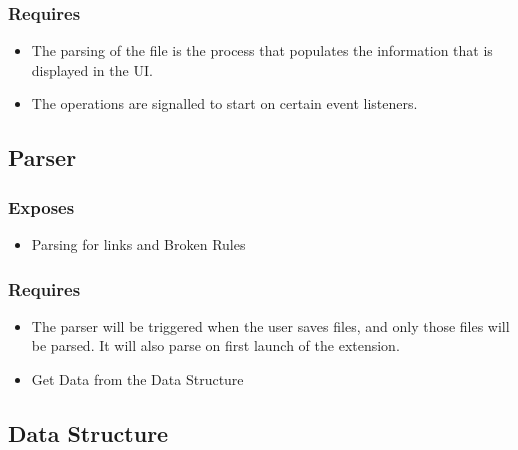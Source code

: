 \documentclass[letterpaper,10pt,titlepage,draftclsnofoot,onecolumn,onesided] {IEEEtran}
\begin{document}
		\subsubsection{Requires}
			\begin{itemize}
			\item The parsing of the file is the process that populates the information that is displayed in the UI.
			\item The operations are signalled to start on certain event listeners.
			\end{itemize}
			
	\subsection{Parser}
		\subsubsection{Exposes}
			\begin{itemize}
			\item Parsing for links and Broken Rules
			\end{itemize}
		\subsubsection{Requires}
			\begin{itemize}
			\item The parser will be triggered when the user saves files, and only those files will be parsed. 
			It will also parse on first launch of the extension.
			\item Get Data from the Data Structure
			\end{itemize}
	
	\subsection{Data Structure}
\end{document}
